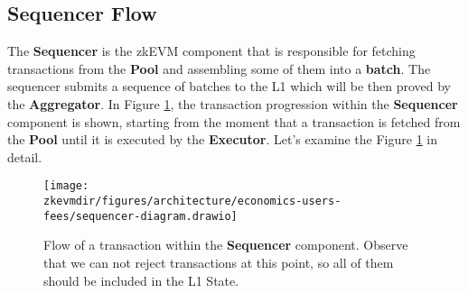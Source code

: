 \subsection{Sequencer Flow}

The \textbf{Sequencer} is the zkEVM component that is responsible for fetching transactions from the \textbf{Pool} and assembling some of them into a \textbf{batch}. The sequencer submits a sequence of batches to the L1 which will be then proved by the \textbf{Aggregator}. In Figure \ref{fig:sequencer-flow}, the transaction progression within the \textbf{Sequencer} component is shown, starting from the moment that a transaction is fetched from the \textbf{Pool} until it is executed by the \textbf{Executor}. Let's examine the Figure \ref{fig:sequencer-flow} in detail.

\begin{figure}[H]
\centering
\texttt{[image: \\zkevmdir/figures/architecture/economics-users-fees/sequencer-diagram.drawio]}
\caption{Flow of a transaction within the \textbf{Sequencer} component. Observe that we can not reject transactions at this point, so all of them should be included in the L1 State. }
\label{fig:sequencer-flow}
\end{figure}

